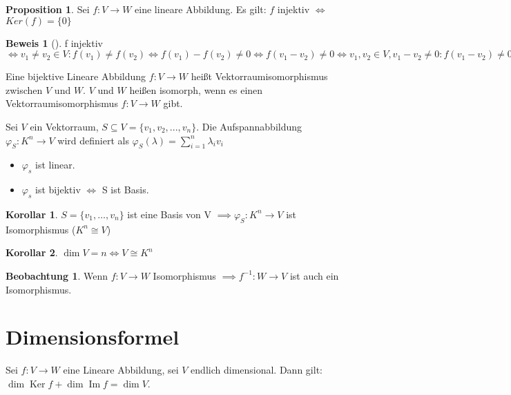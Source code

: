 \documentclass[oneside,fontsize=11pt,paper=a4,BCOR=0mm,DIV=12,automark,headsepline]{scrbook}
\DeclareMathOperator{\mdim}{dim}
\DeclareMathOperator{\mKer}{Ker}
\DeclareMathOperator{\mIm}{Im}
\theoremstyle{remark}
\theoremstyle{definition}
\newtheorem{beobachtung}{Beobachtung}
\newtheorem*{proposition}{Proposition}
\newtheorem*{korollar}{Korollar}
\theoremstyle{definition}
\newtheorem*{prof}{Beweis}
\theoremstyle{remark}
\begin{document}
\begin{proposition}
  Sei \(f:V\rightarrow W\) eine lineare Abbildung. Es gilt: \(f\) injektiv
  $\iff$ \(Ker(f)=\{0\}\)
\end{proposition}

\begin{prof}[]
  f injektiv $\iff v_1 \neq v_2 \in V: f(v_1)\neq f(v_2) \iff f(v_1)-f(v_2)\neq 0 \iff f(v_1 -v_2)\neq 0 \iff v_1,v_2 \in V, v_1-v_2\neq 0: f(v_1 -v_2)\neq 0 \iff v\neq 0: f(v)\neq 0 \iff Ker(f) = \{0\}$
\end{prof}

\begin{definition}{}{}
  Eine bijektive Lineare Abbildung \(f:V\rightarrow W\) heißt Vektorraumisomorphismus
  zwischen \(V\) und \(W\). \(V\) und \(W\) heißen isomorph, wenn es einen
  Vektorraumisomorphismus \(f: V\rightarrow W\) gibt.
\end{definition}

\begin{exa}
  Sei \(V\) ein Vektorraum, \(S\subseteq V = \{v_1, v_2, ..., v_n\}\). Die
  Aufspannabbildung $\varphi_S: K^n \rightarrow V$ wird definiert als $\varphi_S(\lambda)=\sum_{i=1}^{n}\lambda_i v_i$

  \begin{itemize}
  \item \(\varphi_s\) ist linear.
  \item \(\varphi_s\) ist bijektiv \(\iff\) S ist Basis.
  \end{itemize}
\end{exa}

\begin{korollar}
  \(S=\{v_1,\ldots,v_n\}\) ist eine Basis von V $\implies \varphi_S: K^n \rightarrow V$ ist Isomorphismus ($K^n\cong V$)
\end{korollar}

\begin{korollar}
  \(\dim V = n \iff V\cong K^n\)
\end{korollar}

\begin{beobachtung}
  Wenn \(f:V\rightarrow W\) Isomorphismus $\implies f^{-1}:W\rightarrow V $ ist auch ein Isomorphismus.
\end{beobachtung}

\section{Dimensionsformel}
\label{sec:org9a58004}
\begin{theo}{}{}
  Sei \(f:V\to W\) eine Lineare Abbildung, sei \(V\) endlich dimensional. Dann gilt: \(\mdim\mKer f + \mdim\mIm f = \mdim V\).
\end{theo}
\end{document}
